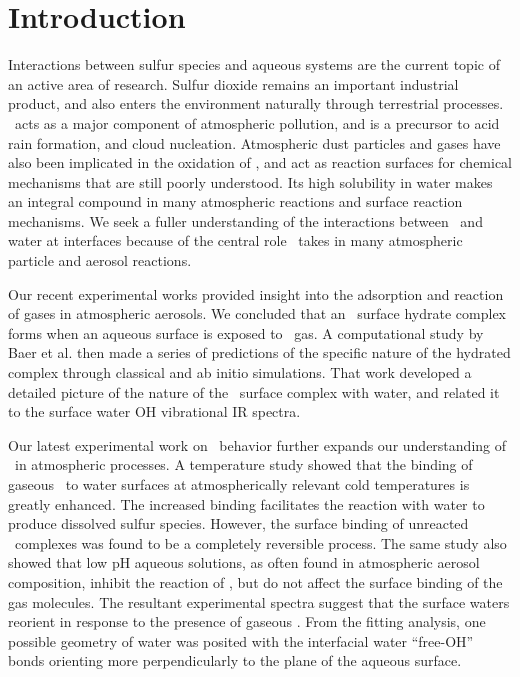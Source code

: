 \section{Introduction}

Interactions between sulfur species and aqueous systems are the current topic of an active area of research. Sulfur dioxide remains an important industrial product, and also enters the environment naturally through terrestrial processes. \suldiox~acts as a major component of atmospheric pollution, and is a precursor to acid rain formation, and cloud nucleation. Atmospheric dust particles and gases have also been implicated in the oxidation of \suldiox, and act as reaction surfaces for chemical mechanisms that are still poorly understood.\cite{Baltrusaitis2011,Rubasinghege2010,Li2007} Its high solubility in water makes \suldiox~ an integral compound in many atmospheric reactions and surface reaction mechanisms. We seek a fuller understanding of the interactions between \suldiox~and water at interfaces because of the central role \suldiox~takes in many atmospheric particle and aerosol reactions.

Our recent experimental works provided insight into the adsorption and reaction of gases in atmospheric aerosols.\cite{Tarbuck2005,Tarbuck2006} We concluded that an \suldiox~surface hydrate complex forms when an aqueous surface is exposed to \suldiox~gas. A computational study by Baer et al.\cite{Baer2010} then made a series of predictions of the specific nature of the hydrated complex through classical and ab initio simulations. That work developed a detailed picture of the nature of the \suldiox~surface complex with water, and related it to the surface water OH vibrational IR spectra.

Our latest experimental work on \suldiox~behavior further expands our understanding of \suldiox~in atmospheric processes.\cite{Ota2011} A temperature study showed that the binding of gaseous \suldiox~to water surfaces at atmospherically relevant cold temperatures is greatly enhanced. The increased binding facilitates the reaction with water to produce dissolved sulfur species. However, the surface binding of unreacted \suldiox~complexes was found to be a completely reversible process. The same study also showed that low pH aqueous solutions, as often found in atmospheric aerosol composition, inhibit the reaction of \suldiox, but do not affect the surface binding of the gas molecules. The resultant experimental spectra suggest that the surface waters reorient in response to the presence of gaseous \suldiox. From the fitting analysis, one possible geometry of water was posited with the interfacial water ``free-OH'' bonds orienting more perpendicularly to the plane of the aqueous surface. 

